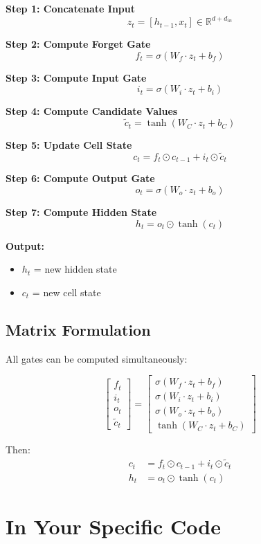 \documentclass[12pt]{article}
\begin{document}
\textbf{Step 1: Concatenate Input}
\[
z_t = [h_{t-1}, x_t] \in \mathbb{R}^{d + d_{in}}
\]

\textbf{Step 2: Compute Forget Gate}
\[
f_t = \sigma(W_f \cdot z_t + b_f)
\]

\textbf{Step 3: Compute Input Gate}
\[
i_t = \sigma(W_i \cdot z_t + b_i)
\]

\textbf{Step 4: Compute Candidate Values}
\[
\tilde{c}_t = \tanh(W_C \cdot z_t + b_C)
\]

\textbf{Step 5: Update Cell State}
\[
c_t = f_t \odot c_{t-1} + i_t \odot \tilde{c}_t
\]

\textbf{Step 6: Compute Output Gate}
\[
o_t = \sigma(W_o \cdot z_t + b_o)
\]

\textbf{Step 7: Compute Hidden State}
\[
h_t = o_t \odot \tanh(c_t)
\]

\textbf{Output:}
\begin{itemize}
    \item $h_t$ = new hidden state
    \item $c_t$ = new cell state
\end{itemize}

\subsection{Matrix Formulation}

All gates can be computed simultaneously:

\[
\begin{bmatrix}
f_t \\
i_t \\
o_t \\
\tilde{c}_t
\end{bmatrix}
=
\begin{bmatrix}
\sigma(W_f \cdot z_t + b_f) \\
\sigma(W_i \cdot z_t + b_i) \\
\sigma(W_o \cdot z_t + b_o) \\
\tanh(W_C \cdot z_t + b_C)
\end{bmatrix}
\]

Then:
\[
\begin{aligned}
c_t &= f_t \odot c_{t-1} + i_t \odot \tilde{c}_t \\
h_t &= o_t \odot \tanh(c_t)
\end{aligned}
\]

\section{In Your Specific Code}
\end{document}
